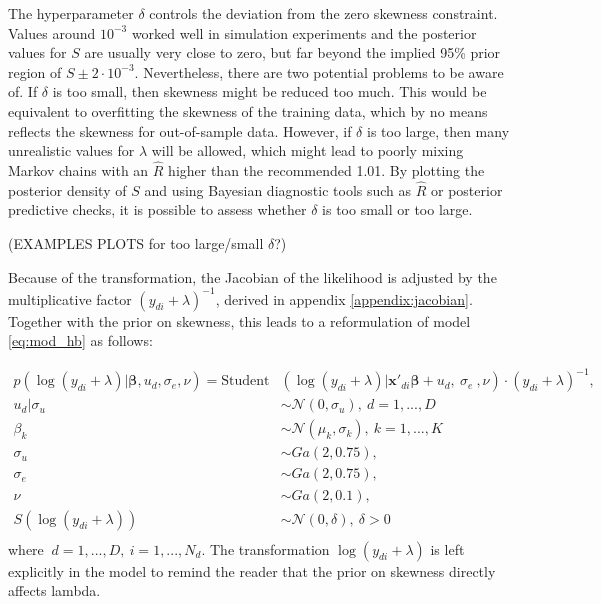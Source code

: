 The hyperparameter $\delta$ controls the deviation from the zero skewness constraint.
Values around $10^{-3}$ worked well in simulation experiments and the posterior values for $S$ are usually very close to zero, but far beyond the implied 95\% prior region of $S \pm 2 \cdot 10^{-3}$.
Nevertheless, there are two potential problems to be aware of.
If $\delta$ is too small, then skewness might be reduced too much.
This would be equivalent to overfitting the skewness of the training data, which by no means reflects the skewness for out-of-sample data.
However, if $\delta$ is too large, then many unrealistic values for $\lambda$ will be allowed, which might lead to poorly mixing Markov chains with an $\hat R$ higher than the recommended 1.01.
By plotting the posterior density of $S$ and using Bayesian diagnostic tools such as $\hat R$ or posterior predictive checks, it is possible to assess whether $\delta$ is too small or too large.

(EXAMPLES PLOTS for too large/small $\delta$?)


Because of the transformation, the Jacobian of the likelihood is adjusted by the multiplicative factor $(y_{di} + \lambda)^{-1}$, derived in appendix \ref{appendix:jacobian}. Together with the prior on skewness, this leads to a reformulation of model \ref{eq:mod_hb} as follows:

\begin{equation}
    \begin{split}
        p(\log(y_{di} + \lambda) |\boldsymbol \beta, u_d, \sigma_e, \nu)   =        \text{Student}&(\log(y_{di} + \lambda)| \boldsymbol{x'}_{di} \boldsymbol \beta + u_d,\ \sigma_e\ , \nu)\cdot (y_{di} + \lambda)^{-1}, \\
        u_d | \sigma_u & \sim \mathcal N(0, \sigma_u),\ d = 1, ..., D \\
        \beta_k & \sim \mathcal N(\mu_k, \sigma_k),\ k = 1, ..., K\\
        \sigma_u & \sim Ga(2, 0.75), \\
        \sigma_e & \sim Ga(2, 0.75), \\
        \nu & \sim Ga(2, 0.1), \\
        S(\log(y_{di} + \lambda)) & \sim \mathcal N(0, \delta), ~ \delta > 0\\
    \end{split}
    \label{eq:trafo_hb}
\end{equation}
where $\ d = 1, ..., D,\ i = 1, ..., N_d$. The transformation $\log(y_{di} + \lambda)$ is left explicitly in the model to remind the reader that the prior on skewness directly affects lambda.

